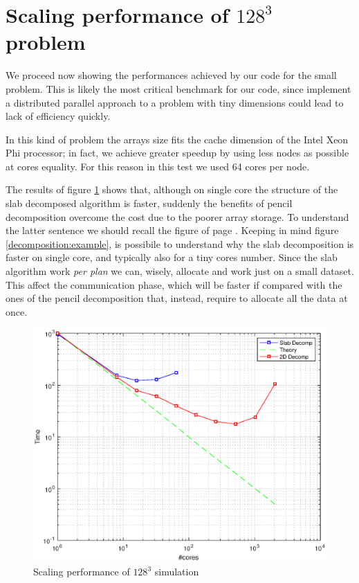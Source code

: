 \section{Scaling performance of $128^3$ problem}
We proceed now showing the performances achieved by our code for the small problem.
This is likely the most critical benchmark for our code, since implement a distributed parallel approach to a problem with tiny dimensions could lead to lack of efficiency quickly. 
\par
In this kind of problem the arrays size fits the cache dimension of the Intel Xeon Phi processor; in fact, we achieve greater speedup by using less nodes as possible at cores equality. For this reason in this test we used 64 cores per node. 
\par
The results of figure \ref{641} shows that, although on single core the structure of the slab decomposed algorithm is faster, suddenly the benefits of pencil decomposition overcome the cost due to the poorer array storage.
To understand the latter sentence we should recall the figure of page \pageref{decomposition:example}.
Keeping in mind figure \ref{decomposition:example}, is possibile to understand why the slab decomposition is faster on single core, and typically also for a tiny cores number. Since the slab algorithm work \emph{per plan} we can, wisely, allocate and work just on a small dataset. This affect the communication phase, which will be faster if compared with the ones of the pencil decomposition that, instead, require to allocate all the data at once. 
\par

\begin{figure}
\begin{center}
\includegraphics[scale=0.6]{grafici/641}
\caption{Scaling performance of $128^3$ simulation}
\label{641}
\end{center}
\end{figure}

